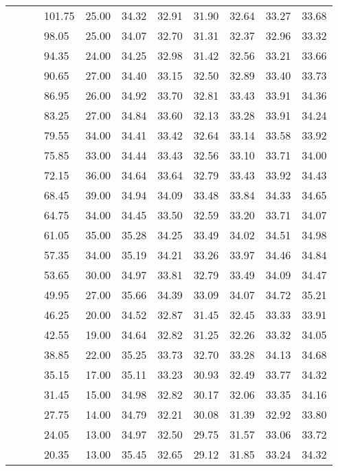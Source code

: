 \begin{longtable}{llllrrrrrrr}
   &  &  & 101.75 & 25.00 & 34.32 & 32.91 & 31.90 & 32.64 & 33.27 & 33.68 \\ 
   &  &  & 98.05 & 25.00 & 34.07 & 32.70 & 31.31 & 32.37 & 32.96 & 33.32 \\ 
   &  &  & 94.35 & 24.00 & 34.25 & 32.98 & 31.42 & 32.56 & 33.21 & 33.66 \\ 
   &  &  & 90.65 & 27.00 & 34.40 & 33.15 & 32.50 & 32.89 & 33.40 & 33.73 \\ 
   &  &  & 86.95 & 26.00 & 34.92 & 33.70 & 32.81 & 33.43 & 33.91 & 34.36 \\ 
   &  &  & 83.25 & 27.00 & 34.84 & 33.60 & 32.13 & 33.28 & 33.91 & 34.24 \\ 
   &  &  & 79.55 & 34.00 & 34.41 & 33.42 & 32.64 & 33.14 & 33.58 & 33.92 \\ 
   &  &  & 75.85 & 33.00 & 34.44 & 33.43 & 32.56 & 33.10 & 33.71 & 34.00 \\ 
   &  &  & 72.15 & 36.00 & 34.64 & 33.64 & 32.79 & 33.43 & 33.92 & 34.43 \\ 
   &  &  & 68.45 & 39.00 & 34.94 & 34.09 & 33.48 & 33.84 & 34.33 & 34.65 \\ 
   &  &  & 64.75 & 34.00 & 34.45 & 33.50 & 32.59 & 33.20 & 33.71 & 34.07 \\ 
   &  &  & 61.05 & 35.00 & 35.28 & 34.25 & 33.49 & 34.02 & 34.51 & 34.98 \\ 
   &  &  & 57.35 & 34.00 & 35.19 & 34.21 & 33.26 & 33.97 & 34.46 & 34.84 \\ 
   &  &  & 53.65 & 30.00 & 34.97 & 33.81 & 32.79 & 33.49 & 34.09 & 34.47 \\ 
   &  &  & 49.95 & 27.00 & 35.66 & 34.39 & 33.09 & 34.07 & 34.72 & 35.21 \\ 
   &  &  & 46.25 & 20.00 & 34.52 & 32.87 & 31.45 & 32.45 & 33.33 & 33.91 \\ 
   &  &  & 42.55 & 19.00 & 34.64 & 32.82 & 31.25 & 32.26 & 33.32 & 34.05 \\ 
   &  &  & 38.85 & 22.00 & 35.25 & 33.73 & 32.70 & 33.28 & 34.13 & 34.68 \\ 
   &  &  & 35.15 & 17.00 & 35.11 & 33.23 & 30.93 & 32.49 & 33.77 & 34.32 \\ 
   &  &  & 31.45 & 15.00 & 34.98 & 32.82 & 30.17 & 32.06 & 33.35 & 34.16 \\ 
   &  &  & 27.75 & 14.00 & 34.79 & 32.21 & 30.08 & 31.39 & 32.92 & 33.80 \\ 
   &  &  & 24.05 & 13.00 & 34.97 & 32.50 & 29.75 & 31.57 & 33.06 & 33.72 \\ 
   &  &  & 20.35 & 13.00 & 35.45 & 32.65 & 29.12 & 31.85 & 33.24 & 34.32 \\ 

\end{longtable}
